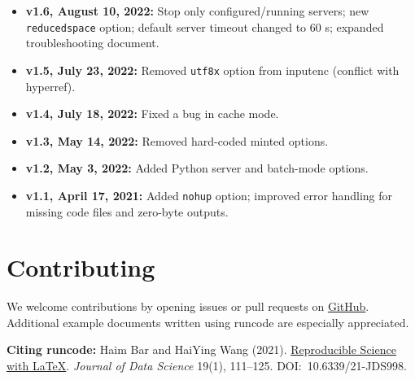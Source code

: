 \documentclass{ltxdoc}
\newcommand{\pkg}[1]{\textsf{#1}}
\newcommand{\opt}[1]{\texttt{#1}}
\begin{document}
\begin{itemize}
\item \textbf{v1.6, August 10, 2022:}
  Stop only configured/running servers; new \opt{reducedspace} option;
  default server timeout changed to 60 s; expanded troubleshooting
  document.

\item \textbf{v1.5, July 23, 2022:}
  Removed \texttt{utf8x} option from \pkg{inputenc} (conflict with
  \pkg{hyperref}).

\item \textbf{v1.4, July 18, 2022:} Fixed a bug in cache mode.

\item \textbf{v1.3, May 14, 2022:} Removed hard-coded \pkg{minted}
  options.

\item \textbf{v1.2, May 3, 2022:} Added Python server and batch-mode
  options.

\item \textbf{v1.1, April 17, 2021:} Added \opt{nohup} option;
  improved error handling for missing code files and zero-byte outputs.

\end{itemize}

\section{Contributing}
\label{sec:contributing}

We welcome contributions by opening issues or pull requests on
\href{https://github.com/Ossifragus/runcode}{GitHub}.  Additional
example documents written using \pkg{runcode} are especially
appreciated.

\bigskip\noindent
\textbf{Citing \pkg{runcode}:}
Haim Bar and HaiYing Wang (2021).
\href{https://jds-online.org/journal/JDS/article/103/info}{Reproducible
Science with \LaTeX{}}.
\textit{Journal of Data Science} 19(1), 111--125.
DOI:~10.6339/21-JDS998.
\end{document}
